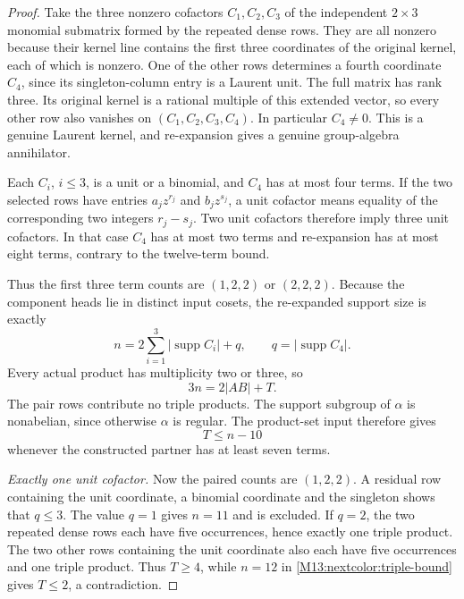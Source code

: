 \documentclass[11pt,a4paper,oneside]{report}
\theoremstyle{definition}
\theoremstyle{remark}
\DeclareMathOperator{\supp}{supp}
\begin{document}
\begin{proof}
Take the three nonzero cofactors $C_1,C_2,C_3$ of the independent
$2\times3$ monomial submatrix formed by the repeated dense rows.
They are all nonzero because their kernel line contains the first
three coordinates of the original kernel, each of which is nonzero.
One of the other rows determines a fourth coordinate $C_4$, since
its singleton-column entry is a Laurent unit.
The full matrix has rank three. Its original kernel is a rational
multiple of this extended vector, so every other row also vanishes
on $(C_1,C_2,C_3,C_4)$. In particular $C_4\ne0$.
This is a genuine Laurent kernel, and re-expansion gives a genuine
group-algebra annihilator.

Each $C_i$, $i\le3$, is a unit or a binomial, and $C_4$ has at
most four terms. If the two selected rows have entries
$a_jz^{r_j}$ and $b_jz^{s_j}$, a unit cofactor means equality of
the corresponding two integers $r_j-s_j$.
Two unit cofactors therefore imply three unit cofactors. In that
case $C_4$ has at most two terms and re-expansion has at most eight
terms, contrary to the twelve-term bound.

Thus the first three term counts are $(1,2,2)$ or $(2,2,2)$.
Because the component heads lie in distinct input cosets, the
re-expanded support size is exactly
\begin{equation}\label{M13:nextcolor:weighted-size}
 n=2\sum_{i=1}^3|\supp C_i|+q,
 \qquad q=|\supp C_4|.
\end{equation}
Every actual product has multiplicity two or three, so
\begin{equation}\label{M13:nextcolor:triple-count}
 3n=2|AB|+T.
\end{equation}
The pair rows contribute no triple products. The support subgroup
of $\alpha$ is nonabelian, since otherwise $\alpha$ is regular.
The product-set input therefore gives
\begin{equation}\label{M13:nextcolor:triple-bound}
 T\le n-10
\end{equation}
whenever the constructed partner has at least seven terms.

\emph{Exactly one unit cofactor.}
Now the paired counts are $(1,2,2)$. A residual row containing
the unit coordinate, a binomial coordinate and the singleton
shows that $q\le3$. The value $q=1$ gives $n=11$ and is excluded.
If $q=2$, the two repeated dense rows each have five occurrences,
hence exactly one triple product. The two other rows containing
the unit coordinate also each have five occurrences and one
triple product. Thus $T\ge4$, while $n=12$ in
\eqref{M13:nextcolor:triple-bound} gives $T\le2$, a contradiction.


\end{proof}
\end{document}
